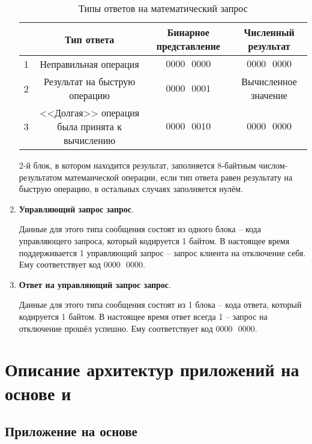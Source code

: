 \begin{enumerate}
	\begin{table}[H]
	\begin{center}
		\caption{Типы ответов на математический запрос}
		\label{tab:math-resp}
		\def\tabcolsep{4pt}
		\fontsize{10}{11}\selectfont
		\begin{tabular}{|c|c|c|c|}
			\hline 
			& Тип ответа & Бинарное представление & Численный результат \\ 
			\hline 
			1 & Неправильная операция & $0000\text{ }0000$ & $0000\text{ }0000$\\ 
			\hline 
			2 & Результат на быструю операцию & $0000\text{ }0001$ & Вычисленное значение\\ 
			\hline 
			3 & <<Долгая>> операция была принята к вычислению & $0000\text{ }0010$ & $0000\text{ }0000$\\ 
			\hline 
		\end{tabular} 
	\end{center}
	\end{table}	

	2-й блок, в котором находится результат, заполняется 8-байтным числом-результатом матемаической операции, если тип ответа равен результату на быструю операцию, в остальных случаях заполняется нулём.	
	
		\item \textbf{Управляющий запрос запрос}.
		
		Данные для этого типа сообщения состоят из одного блока -- кода управляющего запроса, который кодируется 1 байтом. В настоящее время поддерживается 1 управляющий запрос -- запрос клиента на отключение себя. Ему соответствует код $0000\text{ }0000$.
	
		\item \textbf{Ответ на управляющий запрос запрос}.
		
		Данные для этого типа сообщения состоят из 1 блока -- кода ответа, который кодируется 1 байтом. В настоящее время ответ всегда 1 -- запрос на отключение прошёл успешно. Ему соответствует код $0000\text{ }0000$.
	
\end{enumerate}

\section{Описание архитектур приложений на основе  и }

\subsection{Приложение на основе }\label{sec:arch:tcp}


